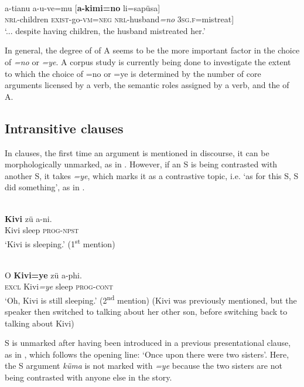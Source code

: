 \documentclass[output=paper]{LSP/langsci}
\begin{document}
\ea\label{13-te-ex:19}
\\
  a-tianu a-u-ve=mu [\textbf{a-kimi=no} li=sapüsa]\\
{ } \textsc{nrl}-children \textsc{exist}-go-\textsc{vm=neg} \textsc{nrl-}husband\textit{=no} 3\textsc{sg.f=}mistreat]\\
\glt ‘... despite having children, the husband mistreated her.’ 
\z

In general, the degree of  of A seems to be the more important factor in the choice of \textit{=no} or \textit{=ye}. A corpus study is currently being done to investigate the extent to which the choice of =no or =ye is determined by the number of core arguments licensed by a verb, the semantic roles assigned by a verb, and the  of A.


\subsection{Intransitive clauses} \label{13-te-sec:3.2}

In  clauses, the first time an argument is mentioned in discourse, it can be morphologically unmarked, as in . However, if an S is being contrasted with another S, it takes \textit{=ye}, which marks it as a contrastive topic, i.e. ‘as for this S, S did something', as in .

\ea\label{13-te-ex:20}
\\
\gll \textbf{Kivi} zü a-ni.\\
Kivi sleep \textsc{prog}-\textsc{npst}\\
\glt ‘Kivi is sleeping.’ (1\textsuperscript{st} mention) 
\z

\ea\label{13-te-ex:21}
\\
\gll O \textbf{Kivi=ye} zü a-phi.\\
\textsc{excl} Kivi\textit{=ye} sleep \textsc{prog}-\textsc{cont}\\
\glt ‘Oh, Kivi is still sleeping.’ (2\textsuperscript{nd} mention) (Kivi was previously mentioned, but the speaker then switched to talking about her other son, before switching back to talking about Kivi) 
\z

S is unmarked after having been introduced in a previous presentational clause, as in , which follows the opening line: ‘Once upon there were two sisters’. Here, the S argument \textit{küma} is not marked with \textit{=ye} because the two sisters are not being contrasted with anyone else in the story.
\end{document}
